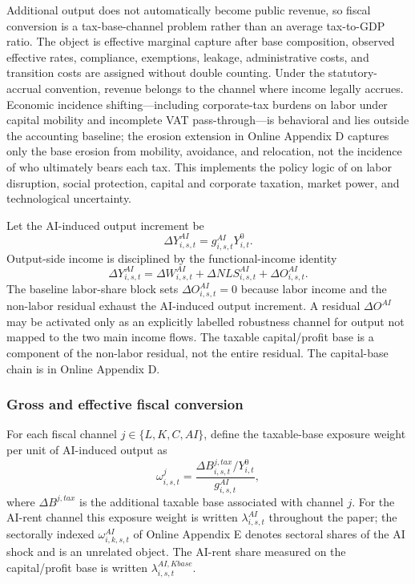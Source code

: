 \documentclass[11pt,a4paper]{article}
\begin{document}
Additional output does not automatically become public revenue, so fiscal conversion is a tax-base-channel problem rather than an average tax-to-GDP ratio. The object is effective marginal capture after base composition, observed effective rates, compliance, exemptions, leakage, administrative costs, and transition costs are assigned without double counting. Under the statutory-accrual convention, revenue belongs to the channel where income legally accrues. Economic incidence shifting---including corporate-tax burdens on labor under capital mobility and incomplete VAT pass-through---is behavioral and lies outside the accounting baseline; the erosion extension in Online Appendix D captures only the base erosion from mobility, avoidance, and relocation, not the incidence of who ultimately bears each tax. This implements the policy logic of \citet{brollo2024fiscal} on labor disruption, social protection, capital and corporate taxation, market power, and technological uncertainty.

Let the AI-induced output increment be
\begin{equation}
    \Delta Y^{AI}_{i,s,t}=g^{AI}_{i,s,t}Y^0_{i,t}.
\end{equation}
Output-side income is disciplined by the functional-income identity
\begin{equation}
    \Delta Y^{AI}_{i,s,t}=\Delta W^{AI}_{i,s,t}+\Delta NLS^{AI}_{i,s,t}+\Delta O^{AI}_{i,s,t}.
\end{equation}
The baseline labor-share block sets $\Delta O^{AI}_{i,s,t}=0$ because labor income and the non-labor residual exhaust the AI-induced output increment. A residual $\Delta O^{AI}$ may be activated only as an explicitly labelled robustness channel for output not mapped to the two main income flows. The taxable capital/profit base is a component of the non-labor residual, not the entire residual. The capital-base chain is in Online Appendix D.

\subsubsection{Gross and effective fiscal conversion}\label{subsec:gross_effective_fiscal_conversion}

For each fiscal channel $j\in\{L,K,C,AI\}$, define the taxable-base exposure weight per unit of AI-induced output as
\begin{equation}
    \omega^j_{i,s,t}
    =\frac{\Delta B^{j,tax}_{i,s,t}/Y^0_{i,t}}{g^{AI}_{i,s,t}},
\end{equation}
where $\Delta B^{j,tax}$ is the additional taxable base associated with channel $j$. For the AI-rent channel this exposure weight is written $\lambda^{AI}_{i,s,t}$ throughout the paper; the sectorally indexed $\omega^{AI}_{i,k,s,t}$ of Online Appendix E denotes sectoral shares of the AI shock and is an unrelated object. The AI-rent share measured on the capital/profit base is written $\lambda^{AI,Kbase}_{i,s,t}$.
\end{document}
